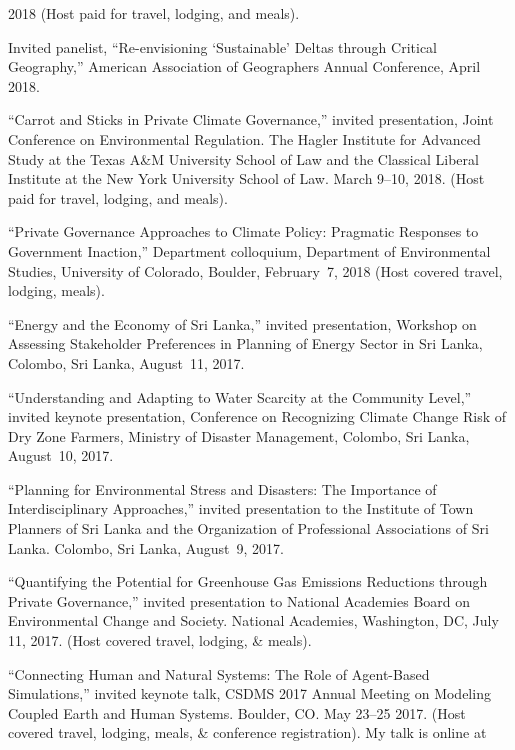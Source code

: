   2018 (Host paid for travel, lodging, and meals).
\item Invited panelist, ``Re-envisioning `Sustainable' Deltas through Critical
  Geography,'' American Association of Geographers Annual Conference, April
  2018.
\item ``Carrot and Sticks in Private Climate Governance,'' invited
  presentation, Joint Conference on Environmental Regulation. The Hagler
  Institute for Advanced Study at the Texas A\&M University School of Law and
  the Classical Liberal Institute at the New York University School of Law.
  March 9--10, 2018. (Host paid for travel, lodging, and meals).
\item ``Private Governance Approaches to Climate Policy: Pragmatic Responses to
  Government Inaction,'' Department colloquium, Department of Environmental
  Studies, University of Colorado, Boulder, February~7, 2018 (Host covered
  travel, lodging, meals).
\item ``Energy and the Economy of Sri Lanka,'' invited presentation, Workshop
  on Assessing Stakeholder Preferences in Planning of Energy Sector in Sri
  Lanka, Colombo, Sri Lanka, August~11, 2017.
\item ``Understanding and Adapting to Water Scarcity at the Community Level,''
  invited keynote presentation, Conference on Recognizing Climate Change Risk
  of Dry Zone Farmers, Ministry of Disaster Management, Colombo, Sri Lanka,
  August~10, 2017.
\item ``Planning for Environmental Stress and Disasters: The Importance of
  Interdisciplinary Approaches,'' invited presentation to the Institute of Town
  Planners of Sri Lanka and the Organization of Professional Associations of
  Sri Lanka. Colombo, Sri Lanka, August~9, 2017.
\item ``Quantifying the Potential for Greenhouse Gas Emissions Reductions
  through Private Governance,'' invited presentation to National Academies
  Board on Environmental Change and Society. National Academies, Washington,
  DC, July 11, 2017. (Host covered travel, lodging, \& meals).
\item  ``Connecting Human and Natural Systems: The Role of Agent-Based
  Simulations,'' invited keynote talk, CSDMS 2017 Annual Meeting on Modeling
  Coupled Earth and Human Systems. Boulder, CO. May 23--25 2017. (Host covered
  travel, lodging, meals, \& conference registration). My talk is online at

